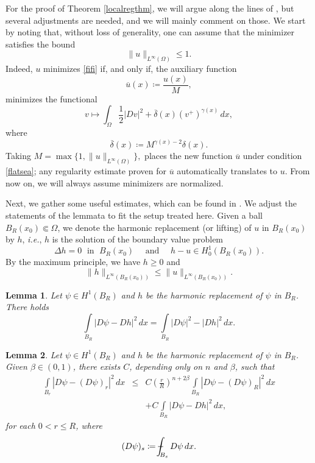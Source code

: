 \documentclass[reqno,11pt]{amsart}
\newtheorem{lemma}{Lemma}[section]
\newcommand{\1}{\mathds{1}}
\numberwithin{equation}{section}
\newcommand{\intav}[1]{\mathchoice {\mathop{\vrule width 6pt height 3 pt depth  -2.5pt
\kern -8pt \intop}\nolimits_{\kern -6pt#1}} {\mathop{\vrule width
5pt height 3  pt depth -2.6pt \kern -6pt \intop}\nolimits_{#1}}
{\mathop{\vrule width 5pt height 3 pt depth -2.6pt \kern -6pt
\intop}\nolimits_{#1}} {\mathop{\vrule width 5pt height 3 pt depth
-2.6pt \kern -6pt \intop}\nolimits_{#1}}}
\begin{document}
For the proof of Theorem \ref{localregthm}, we will argue along the lines of \cite{GG, LQT}, but several adjustments are needed, and we will mainly comment on those. We start by noting that, without loss of generality, one can assume that the minimizer satisfies the bound
\begin{equation}\label{flatsea}
	\|u\|_{L^\infty(\Omega)} \leq 1.
\end{equation}
Indeed, $u$ minimizes \eqref{fifi} if, and only if, the auxiliary function 
$$
\overline{u}(x)\coloneqq \frac{u(x)}{M},
$$
minimizes the functional
\begin{equation}\nonumber
v \mapsto \int_{\Omega} \frac12 \left| Dv \right|^2 + \overline{\delta}(x) (v^+)^{\gamma(x)}  \, dx,
\end{equation}
where 
$$
	\overline{\delta}(x)\coloneqq M^{\gamma(x)-2}\delta(x).
$$
Taking $M=\max\{1, \|u\|_{L^\infty(\Omega)}\},$  places the new function $\overline{u}$ under condition \eqref{flatsea}; any regularity estimate proven for $\overline{u}$ automatically translates to $u$. From now on, we will always assume minimizers are normalized.

\medskip

Next, we gather some useful estimates, which can be found in \cite[Lemma 2.4 and Lemma 4.1, respectively]{LQT}. We adjust the statements of the lemmata to fit the setup treated here. Given a ball $B_R(x_0) \Subset \Omega$, we denote the harmonic replacement (or lifting) of $u$ in $B_R(x_0)$ by $h$, \textit{i.e.}, $h$ is the solution of the boundary value problem
$$
	\Delta h=0 \; \text{ in }\; B_R(x_0)  \quad \text{ and } \quad h-u \in H^1_0(B_R(x_0)).
$$ 
By the maximum principle, we have $h\geq 0$ and
\begin{equation}\label{harmonic}
\|h\|_{L^\infty(B_R(x_0))} \leq \|u\|_{L^{\infty}(B_R(x_0))}.
\end{equation}

\begin{lemma}\label{manaira}
Let $\psi \in H^1(B_R)$ and $h$ be the harmonic replacement of $\psi$ in $B_R$. There holds 
\begin{equation}\label{ICTP}
\int\limits_{B_R}|D\psi-Dh|^2 \, dx = \int\limits_{B_R}|D\psi|^2-|Dh|^2 \, dx. 
\end{equation}
\end{lemma}

\begin{lemma}\label{cariri}
Let $\psi \in H^1(B_R)$ and $h$ be the harmonic replacement of $\psi$ in $B_R$. Given $\beta \in (0,1)$, there exists $C$, depending only on $n$ and $\beta$, such that 
\begin{eqnarray*}
\int\limits_{B_r}|D\psi-(D\psi)_r|^2 \, dx & \leq & C\left( \frac{r}{R}\right)^{n+2\beta} \int\limits_{B_R}|D\psi-(D\psi)_R|^2 \, dx \\
& & + C\int\limits_{B_R}|D\psi-Dh|^2 \, dx,
\end{eqnarray*}
for each $0<r \leq R$, where 
\begin{equation*}
    (D\psi)_s \coloneqq \intav{B_s}D\psi\,dx.
\end{equation*}
\end{lemma}
\end{document}
